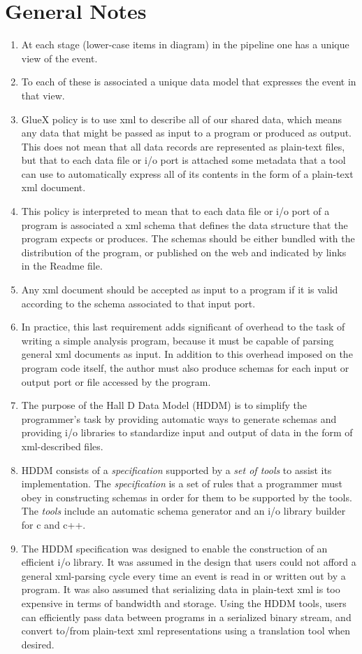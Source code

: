 \documentclass[10pt]{article}
\begin{document}
\section{General Notes}
\begin{enumerate}
\item  At each stage (lower-case items in diagram) in the pipeline one has a unique view of the event. 
\item  To each of these is associated a unique data model that expresses the event in that view. 
\item  GlueX policy is to use xml to describe all of our shared data, which means any data that might be passed as input to a program or produced as output. This does not mean that all data records are represented as plain-text files, but that to each data file or i/o port is attached some metadata that a tool can use to automatically express all of its contents in the form of a plain-text xml document. 
\item  This policy is interpreted to mean that to each data file or i/o port of a program is associated a xml schema that defines the data structure that the program expects or produces. The schemas should be either bundled with the distribution of the program, or published on the web and indicated by links in the Readme file. 
\item  Any xml document should be accepted as input to a program if it is valid according to the schema associated to that input port. 
\item  In practice, this last requirement adds significant of overhead to the task of writing a simple analysis program, because it must be capable of parsing general xml documents as input. In addition to this overhead imposed on the program code itself, the author must also produce schemas for each input or output port or file accessed by the program. 
\item  The purpose of the Hall D Data Model (HDDM) is to simplify the programmer's task by providing automatic ways to generate schemas and providing i/o libraries to standardize input and output of data in the form of xml-described files. 
\item  HDDM consists of a \emph{specification}
 supported by a \emph{set of tools}
 to assist its implementation. The \emph{specification}
 is a set of rules that a programmer must obey in constructing schemas in order for them to be supported by the tools. The \emph{tools}
 include an automatic schema generator and an i/o library builder for c and c++. 
\item  The HDDM specification was designed to enable the construction of an efficient i/o library. It was assumed in the design that users could not afford a general xml-parsing cycle every time an event is read in or written out by a program. It was also assumed that serializing data in plain-text xml is too expensive in terms of bandwidth and storage. Using the HDDM tools, users can efficiently pass data between programs in a serialized binary stream, and convert to/from plain-text xml representations using a translation tool when desired. 

\end{enumerate}
\end{document}
